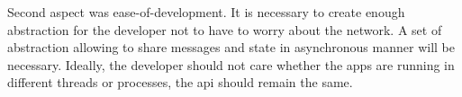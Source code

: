 Second aspect was ease-of-development. It is necessary to create enough abstraction for the developer not to have to worry about the network. A set of abstraction allowing to share messages and state in asynchronous manner will be necessary. Ideally, the developer should not care whether the apps are running in different threads or processes, the api should remain the same.
